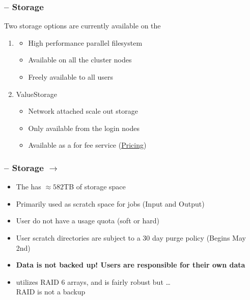\begin{frame}
	\frametitle{{\craycs} -- Storage}
	Two storage options are currently available on the {\craycs}
	\begin{enumerate}
		\item {\lustre}
                  \begin{itemize}
                  \item High performance parallel filesystem 
                  \item Available on all the cluster nodes
                    \item Freely available to all users
                  \end{itemize}
		\item ValueStorage
                  \begin{itemize}
                  \item Network attached scale out storage
                  \item Only available from the login nodes
                  \item Available as a for fee service (\href{http://www.hawaii.edu/its/value-storage-pricing/}{Pricing})
                  \end{itemize}
	\end{enumerate}
\end{frame}


\begin{frame}
	\frametitle{{\craycs} -- Storage $\rightarrow$ {\lustre}}
	\begin{itemize}
		\item The {\craycs} has $\approx582$TB of storage space

		\item Primarily used as scratch space for jobs (Input and Output)
		\item User do not have a usage quota (soft or hard)
		\item User scratch directories are subject to a 30 day purge policy (Begins May 2nd)
		\item \textbf{Data is not backed up!  Users are responsible for their own data}
                \item {\lustre} utilizes RAID 6 arrays, and is fairly robust but \ldots~\\RAID is not a backup
	\end{itemize}
\end{frame}




